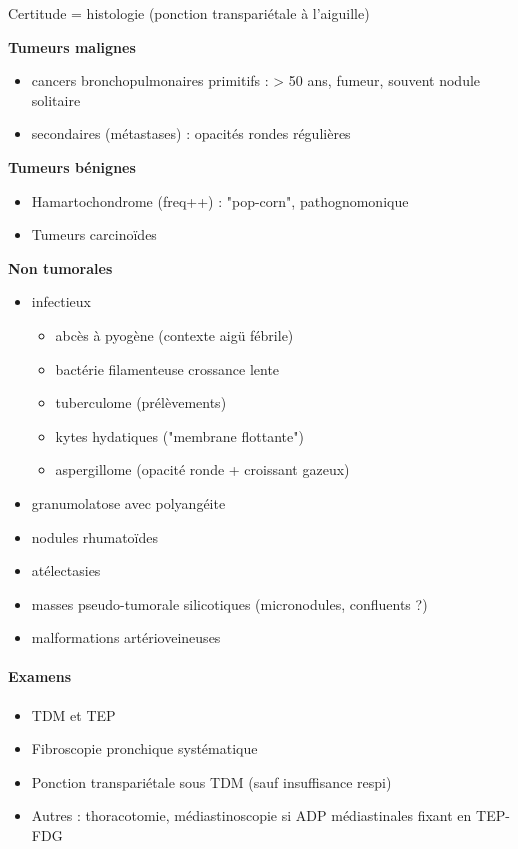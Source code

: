 \documentclass[11pt]{article}
\begin{document}
Certitude = histologie (ponction transpariétale à l'aiguille)

\textbf{Tumeurs malignes}  

\begin{itemize}
\item cancers bronchopulmonaires primitifs : > 50 ans, fumeur, souvent nodule
solitaire
\item secondaires (métastases) : opacités rondes régulières
\end{itemize}


\textbf{Tumeurs bénignes} 

\begin{itemize}
\item Hamartochondrome (freq++) : "pop-corn", pathognomonique
\item Tumeurs  carcinoïdes
\end{itemize}


\textbf{Non tumorales}

\begin{itemize}
\item infectieux 

\begin{itemize}
\item abcès à pyogène (contexte aigü fébrile)
\item bactérie filamenteuse crossance lente
\item tuberculome (\thus prélèvements)
\item kytes hydatiques ("membrane flottante")
\item aspergillome (opacité ronde + croissant gazeux)
\end{itemize}

\item granumolatose avec polyangéite
\item nodules rhumatoïdes
\item atélectasies
\item masses pseudo-tumorale silicotiques (micronodules, confluents ?)
\item malformations artérioveineuses
\end{itemize}


\paragraph{Examens}
\label{sec:orga896e1f}

\begin{itemize}
\item TDM et TEP
\item Fibroscopie pronchique systématique
\item Ponction transpariétale sous TDM (sauf insuffisance respi)
\item Autres : thoracotomie, médiastinoscopie si ADP médiastinales fixant en TEP-FDG
\end{itemize}
\end{document}
